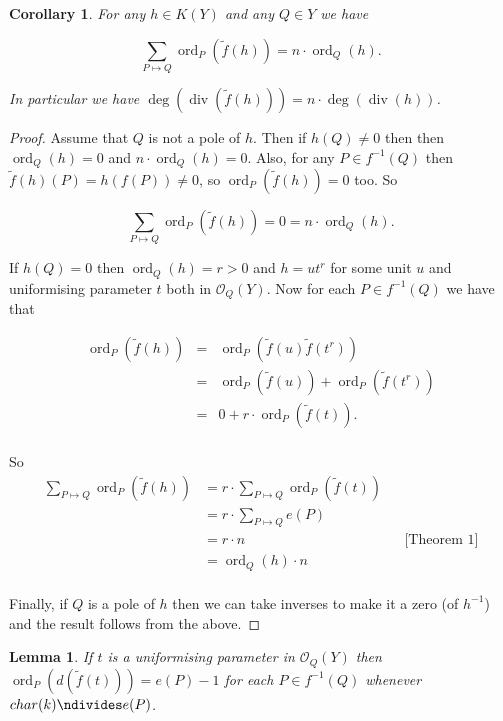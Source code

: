 \documentclass[11pt]{article} %
\newtheorem{cor}{Corollary}
\newtheorem{lem}{Lemma}
\DeclareMathOperator{\di}{div}
\DeclareMathOperator{\ord}{ord}
\begin{document}
\begin{cor}
	For any $h\in K(Y)$ and any $Q\in Y$ we have

		\begin{equation*}
			\sum_{P\mapsto Q} \ord_{P} (\tilde{f}(h))=n\cdot \ord_{Q}(h).
		\end{equation*}

	In particular we have $\deg( \di(\tilde{f}(h)))=n\cdot \deg( \di (h))$.
\end{cor}

\begin{proof}
	Assume that $Q$ is not a pole of $h$. Then if $h(Q)\neq 0$ then  then $\ord_{Q}(h)=0$ and $n\cdot \ord_{Q}			(h)=0$. Also, for any $P\in f^{-1}(Q)$ then $\tilde{f}(h)(P)=h(f(P))\neq 0$, so $\ord_{P}(\tilde{f}(h))=0$ too. 			So

		\begin{equation*}
			\sum_{P\mapsto Q} \ord_{P}(\tilde{f}(h))=0=n\cdot \ord_{Q}(h).
		\end{equation*}

	If $h(Q)=0$ then $\ord_{Q}(h)=r>0$ and $h=ut^{r}$ for some unit $u$ and uniformising parameter $t$ both in 		$\mathscr{O}_{Q}(Y)$. Now for each $P\in f^{-1}(Q)$ we have that 

		\begin{eqnarray*}
			\ord_{P}(\tilde{f}(h)) & = & \ord_{P}(\tilde{f}(u)\tilde{f}(t^{r})) \nonumber \\
			&  = & \ord_{P}(\tilde{f}(u))+\ord_{P}(\tilde{f}(t^{r})) \nonumber\\
			& = &  0 + r\cdot \ord_{P}(\tilde{f}(t)). \nonumber \\
		\end{eqnarray*}

	So
		\begin{align*}
			\sum_{P\mapsto Q}\ord_{P}(\tilde{f}(h)) & =  r\cdot \sum_{P\mapsto Q} \ord_{P}(\tilde{f}(t)) \\
			& = r\cdot \sum_{P\mapsto Q} e(P) \\
			& = r\cdot n && \mbox{[Theorem 1]} \\
			& = \ord_{Q}(h)\cdot n \\
		\end{align*}

	Finally, if $Q$ is a pole of $h$ then we can take inverses to make it a zero (of $h^{-1}$) and the result follows 			from the above.
\end{proof}

\begin{lem}
	If $t$ is a uniformising parameter in $\mathscr{O}_{Q}(Y)$ then $\ord_{P}(d(\tilde{f}(t)))=e(P)-1$ for each $P\in 			f^{-1}(Q)$ whenever $char(k)\ndivides e(P)$.
\end{lem}
\end{document}
